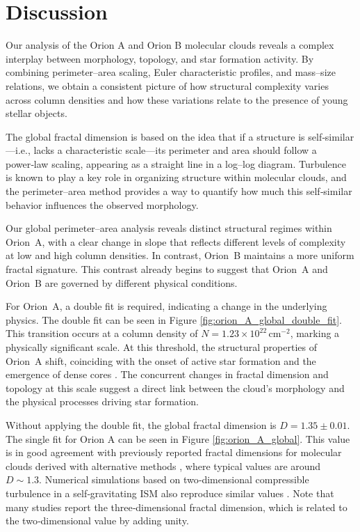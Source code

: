 \chapter{Discussion}

Our analysis of the Orion A and Orion B molecular clouds reveals a complex interplay between morphology, topology, and star formation activity. 
By combining perimeter–area scaling, Euler characteristic profiles, and mass–size relations, we obtain a consistent picture of how structural complexity varies across column densities and how these variations relate to the presence of young stellar objects.

The global fractal dimension is based on the idea that if a structure is self‑similar—i.e., lacks a characteristic scale—its perimeter and area should follow a power‑law scaling, appearing as a straight line in a log–log diagram.  
Turbulence is known to play a key role in organizing structure within molecular clouds, and the perimeter–area method provides a way to quantify how much this self‑similar behavior influences the observed morphology.

Our global perimeter–area analysis reveals distinct structural regimes within Orion~A, with a clear change in slope that reflects different levels of complexity at low and high column densities.  
In contrast, Orion~B maintains a more uniform fractal signature.  
This contrast already begins to suggest that Orion~A and Orion~B are governed by different physical conditions.

For Orion~A, a double fit is required, indicating a change in the underlying physics. The double fit can be seen in Figure \ref{fig:orion_A_global_double_fit}. 
This transition occurs at a column density of \(N = 1.23 \times 10^{22}\,\mathrm{cm}^{-2}\), marking a physically significant scale.  
At this threshold, the structural properties of Orion~A shift, coinciding with the onset of active star formation and the emergence of dense cores \cite{lada2010star}.  
The concurrent changes in fractal dimension and topology at this scale suggest a direct link between the cloud’s morphology and the physical processes driving star formation.

Without applying the double fit, the global fractal dimension is \(D = 1.35 \pm 0.01\). The single fit for Orion A can be seen in Figure \ref{fig:orion_A_global}. 
This value is in good agreement with previously reported fractal dimensions for molecular clouds derived with alternative methods \cite{elmegreen1996fractal}, where typical values are around \(D \sim 1.3\).  
Numerical simulations based on two‑dimensional compressible turbulence in a self‑gravitating ISM also reproduce similar values \cite{1994fns..book..515Y}.  
Note that many studies report the three‑dimensional fractal dimension, which is related to the two‑dimensional value by adding unity.


